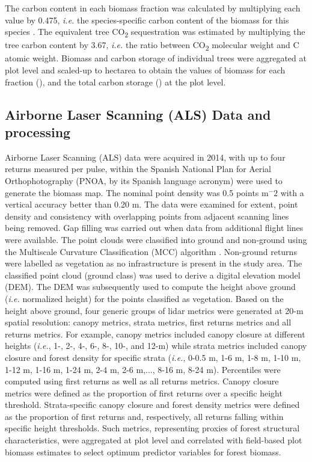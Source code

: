 The carbon content in each biomass fraction was calculated by multiplying each value by 0.475, \emph{i.e.} the species-specific carbon content of the biomass for this species  \autocite{Ibanezetal2002MetodologiaComplementaria,Monteroetal2005ProduccionBiomasa}. The equivalent tree CO\textsubscript{2} sequestration was estimated by multiplying the tree carbon content by 3.67, \emph{i.e.} the ratio between CO\textsubscript{2} molecular weight and C atomic weight. Biomass and carbon storage of individual trees were aggregated at plot level and  scaled-up to hectarea to obtain the values of biomass for each fraction (\mgha), and the total carbon storage (\mgha) at the plot level.

\subsection{Airborne Laser Scanning (ALS) Data and processing}\label{sec:carbon:mat-lidar}
Airborne Laser Scanning (ALS) data were acquired in 2014, with up to four returns measured per pulse, within the Spanish National Plan for Aerial Orthophotography (PNOA, by its Spanish language acronym) were used to generate the biomass map. The nominal point density was 0.5 points m$^-2$ with a vertical accuracy better than 0.20 m. 
The data were examined for extent, point density and consistency with overlapping points from adjacent scanning lines being removed. Gap filling was carried out when data from additional flight lines were available. The point clouds were classified into ground and non-ground using the Multiscale Curvature Classification (MCC) algorithm \autocite{EvansHudak2007MultiscaleCurvature}. Non-ground returns were labelled as vegetation as no infrastructure is present in the study area. The classified point cloud (ground class) was used to derive a digital elevation model (DEM). The DEM was subsequently used to compute the height above ground (\emph{i.e.} normalized height) for the points classified as vegetation. Based on the height above ground, four generic groups of lidar metrics were generated at 20-m spatial resolution: canopy metrics, strata metrics, first returns metrics and all returns metrics. For example, canopy metrics included canopy closure at different heights (\emph{i.e.}, 1-, 2-, 4-, 6-, 8-, 10-, and 12-m) while strata metrics included canopy closure and forest density for specific strata (\emph{i.e.}, 0-0.5 m, 1-6 m, 1-8 m, 1-10 m, 1-12 m, 1-16 m, 1-24 m, 2-4 m, 2-6 m,..., 8-16 m, 8-24 m). Percentiles were computed using first returns as well as all returns metrics. Canopy closure metrics were defined as the proportion of first returns over a specific height threshold. Strata-specific canopy closure and forest density metrics were defined as the proportion of first returns and, respectively, all returns falling within specific height thresholds. Such metrics, representing proxies of forest structural characteristics, were aggregated at plot level and correlated with field-based plot biomass estimates to select optimum predictor variables for forest biomass.
